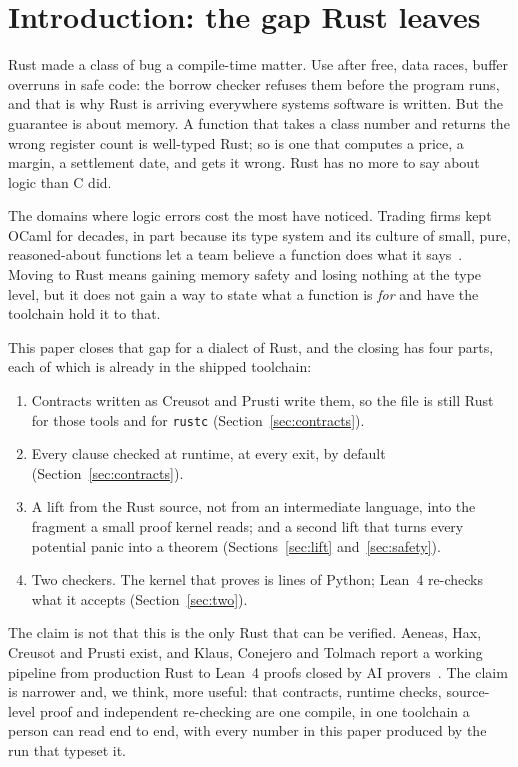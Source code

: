 \documentclass[11pt]{article}
\begin{document}
\section{Introduction: the gap Rust leaves}

Rust made a class of bug a compile-time matter.  Use after free, data
races, buffer overruns in safe code: the borrow checker refuses them before
the program runs, and that is why Rust is arriving everywhere systems
software is written.  But the guarantee is about memory.  A function that
takes a class number and returns the wrong register count is well-typed
Rust; so is one that computes a price, a margin, a settlement date, and
gets it wrong.  Rust has no more to say about logic than C did.

The domains where logic errors cost the most have noticed.  Trading firms
kept OCaml for decades, in part because its type system and its culture of
small, pure, reasoned-about functions let a team believe a function does
what it says~\cite{biggar2020}.  Moving to Rust means gaining memory safety
and losing nothing at the type level, but it does not gain a way to state
what a function is \emph{for} and have the toolchain hold it to that.

This paper closes that gap for a dialect of Rust, and the closing has four
parts, each of which is already in the shipped toolchain:

\begin{enumerate}
\item Contracts written as Creusot and Prusti write them, so the file is
  still Rust for those tools and for \texttt{rustc}
  (Section~\ref{sec:contracts}).
\item Every clause checked at runtime, at every exit, by default
  (Section~\ref{sec:contracts}).
\item A lift from the Rust source, not from an intermediate language, into
  the fragment a small proof kernel reads; and a second lift that turns every
  potential panic into a theorem (Sections~\ref{sec:lift}
  and~\ref{sec:safety}).
\item Two checkers.  The kernel that proves is  lines of
  Python; Lean~4 re-checks what it accepts (Section~\ref{sec:two}).
\end{enumerate}

The claim is not that this is the only Rust that can be verified.  Aeneas,
Hax, Creusot and Prusti exist, and Klaus, Conejero and Tolmach report a
working pipeline from production Rust to Lean~4 proofs closed by AI
provers~\cite{klaus2026}.  The claim is narrower and, we think, more useful:
that contracts, runtime checks, source-level proof and independent
re-checking are one compile, in one toolchain a person can read end to
end, with every number in this paper produced by the run that typeset it.
\end{document}
